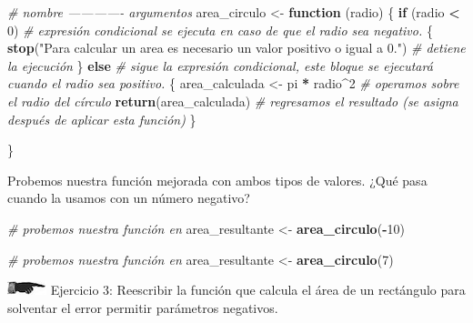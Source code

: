 \documentclass[]{book}
\newenvironment{Shaded}{\begin{snugshade}}{\end{snugshade}}
\newcommand{\KeywordTok}[1]{\textcolor[rgb]{0.13,0.29,0.53}{\textbf{#1}}}
\newcommand{\DecValTok}[1]{\textcolor[rgb]{0.00,0.00,0.81}{#1}}
\newcommand{\StringTok}[1]{\textcolor[rgb]{0.31,0.60,0.02}{#1}}
\newcommand{\CommentTok}[1]{\textcolor[rgb]{0.56,0.35,0.01}{\textit{#1}}}
\newcommand{\ControlFlowTok}[1]{\textcolor[rgb]{0.13,0.29,0.53}{\textbf{#1}}}
\newcommand{\OperatorTok}[1]{\textcolor[rgb]{0.81,0.36,0.00}{\textbf{#1}}}
\newcommand{\NormalTok}[1]{#1}
\theoremstyle{definition}
\theoremstyle{definition}
\theoremstyle{definition}
\theoremstyle{remark}
\begin{document}
\begin{Shaded}
\begin{Highlighting}[]
\CommentTok{# nombre ------------- argumentos}
\NormalTok{area_circulo <-}\StringTok{ }\ControlFlowTok{function}\NormalTok{ (radio) \{}
  \ControlFlowTok{if}\NormalTok{ (radio }\OperatorTok{<}\StringTok{ }\DecValTok{0}\NormalTok{) }\CommentTok{# expresión condicional se ejecuta en caso de que el radio sea negativo.}
\NormalTok{  \{}
    \KeywordTok{stop}\NormalTok{(}\StringTok{"Para calcular un area es necesario un valor positivo o igual a 0."}\NormalTok{) }\CommentTok{# detiene la ejecución}
\NormalTok{  \} }\ControlFlowTok{else} \CommentTok{# sigue la expresión condicional, este bloque se ejecutará cuando el radio sea positivo.}
\NormalTok{  \{}
\NormalTok{    area_calculada <-}\StringTok{ }\NormalTok{pi }\OperatorTok{*}\StringTok{ }\NormalTok{radio}\OperatorTok{^}\DecValTok{2} \CommentTok{# operamos sobre el radio del círculo}
    \KeywordTok{return}\NormalTok{(area_calculada) }\CommentTok{# regresamos el resultado (se asigna después de aplicar esta función)}
\NormalTok{  \}}
  
\NormalTok{\}}
\end{Highlighting}
\end{Shaded}

Probemos nuestra función mejorada con ambos tipos de valores. ¿Qué pasa
cuando la usamos con un número negativo?

\begin{Shaded}
\begin{Highlighting}[]
\CommentTok{# probemos nuestra función en}
\NormalTok{area_resultante <-}\StringTok{ }\KeywordTok{area_circulo}\NormalTok{(}\OperatorTok{-}\DecValTok{10}\NormalTok{)}
\end{Highlighting}
\end{Shaded}

\begin{Shaded}
\begin{Highlighting}[]
\CommentTok{# probemos nuestra función en}
\NormalTok{area_resultante <-}\StringTok{ }\KeywordTok{area_circulo}\NormalTok{(}\DecValTok{7}\NormalTok{)}
\end{Highlighting}
\end{Shaded}

\includegraphics{./imagenes/manicule2.jpg} Ejercicio 3: Reescribir la
función que calcula el área de un rectángulo para solventar el error
permitir parámetros negativos.
\end{document}

